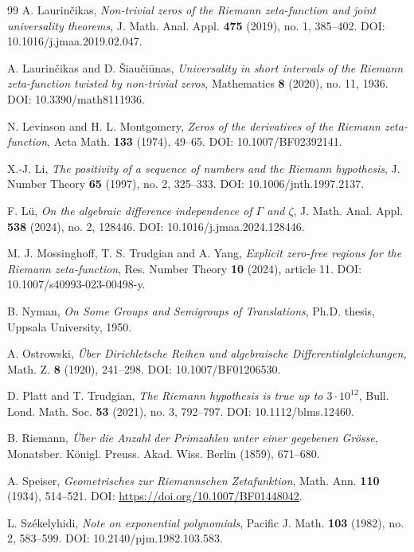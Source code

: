 \documentclass[11pt]{amsart}
\numberwithin{equation}{section}
\begin{document}
\begin{thebibliography}{99}
A. Laurin\v{c}ikas,
\emph{Non-trivial zeros of the Riemann zeta-function and joint universality theorems},
J. Math. Anal. Appl. \textbf{475} (2019), no. 1, 385--402.
DOI: 10.1016/j.jmaa.2019.02.047.

A. Laurin\v{c}ikas and D. \v{S}iau\v{c}i\=unas,
\emph{Universality in short intervals of the Riemann zeta-function twisted by non-trivial zeros},
Mathematics \textbf{8} (2020), no. 11, 1936.
DOI: 10.3390/math8111936.

N. Levinson and H. L. Montgomery,
\emph{Zeros of the derivatives of the Riemann zeta-function},
Acta Math. \textbf{133} (1974), 49--65.
DOI: 10.1007/BF02392141.

X.-J. Li,
\emph{The positivity of a sequence of numbers and the Riemann hypothesis},
J. Number Theory \textbf{65} (1997), no. 2, 325--333.
DOI: 10.1006/jnth.1997.2137.

F. L\"u,
\emph{On the algebraic difference independence of $\Gamma$ and $\zeta$},
J. Math. Anal. Appl. \textbf{538} (2024), no. 2, 128446.
DOI: 10.1016/j.jmaa.2024.128446.

M. J. Mossinghoff, T. S. Trudgian and A. Yang,
\emph{Explicit zero-free regions for the Riemann zeta-function},
Res. Number Theory \textbf{10} (2024), article 11.
DOI: 10.1007/s40993-023-00498-y.

B. Nyman,
\emph{On Some Groups and Semigroups of Translations},
Ph.D. thesis, Uppsala University, 1950.

A. Ostrowski,
\emph{\"Uber Dirichletsche Reihen und algebraische Differentialgleichungen},
Math. Z. \textbf{8} (1920), 241--298.
DOI: 10.1007/BF01206530.

D. Platt and T. Trudgian,
\emph{The Riemann hypothesis is true up to $3\cdot10^{12}$},
Bull. Lond. Math. Soc. \textbf{53} (2021), no. 3, 792--797.
DOI: 10.1112/blms.12460.

B. Riemann,
\emph{\"Uber die Anzahl der Primzahlen unter einer gegebenen Gr\"osse},
Monatsber. K\"onigl. Preuss. Akad. Wiss. Berlin (1859), 671--680.

A. Speiser,
\emph{Geometrisches zur Riemannschen Zetafunktion},
Math. Ann. \textbf{110} (1934), 514--521.
DOI: \url{https://doi.org/10.1007/BF01448042}.

L. Sz\'ekelyhidi,
\emph{Note on exponential polynomials},
Pacific J. Math. \textbf{103} (1982), no. 2, 583--599.
DOI: 10.2140/pjm.1982.103.583.


\end{thebibliography}
\end{document}

